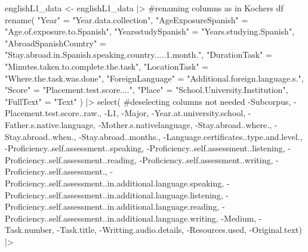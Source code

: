 \documentclass[
  letterpaper,
  DIV=11,
  numbers=noendperiod]{scrartcl}
\newenvironment{Shaded}{\begin{snugshade}}{\end{snugshade}}
\newcommand{\CommentTok}[1]{\textcolor[rgb]{0.37,0.37,0.37}{#1}}
\newcommand{\FunctionTok}[1]{\textcolor[rgb]{0.28,0.35,0.67}{#1}}
\newcommand{\NormalTok}[1]{\textcolor[rgb]{0.00,0.23,0.31}{#1}}
\newcommand{\OtherTok}[1]{\textcolor[rgb]{0.00,0.23,0.31}{#1}}
\newcommand{\SpecialCharTok}[1]{\textcolor[rgb]{0.37,0.37,0.37}{#1}}
\newcommand{\StringTok}[1]{\textcolor[rgb]{0.13,0.47,0.30}{#1}}
\begin{document}
\begin{Shaded}
\begin{Highlighting}[]
\NormalTok{englishL1\_data }\OtherTok{\textless{}{-}}\NormalTok{ englishL1\_data }\SpecialCharTok{|\textgreater{}}  \CommentTok{\#renaming columns as in Kochers df}
  \FunctionTok{rename}\NormalTok{(}
    \StringTok{"Year"} \OtherTok{=} \StringTok{"Year.data.collection"}\NormalTok{,}
    \StringTok{"AgeExposureSpanish"} \OtherTok{=} \StringTok{"Age.of.exposure.to.Spanish"}\NormalTok{,}
    \StringTok{"YearsstudySpanish"} \OtherTok{=} \StringTok{"Years.studying.Spanish"}\NormalTok{,}
    \StringTok{"AbroadSpanishCountry"} \OtherTok{=} \StringTok{"Stay.abroad.in.Spanish.speaking.country.....1.month."}\NormalTok{,}
    \StringTok{"DurationTask"} \OtherTok{=} \StringTok{"Minutes.taken.to.complete.the.task"}\NormalTok{,}
    \StringTok{"LocationTask"} \OtherTok{=} \StringTok{"Where.the.task.was.done"}\NormalTok{,}
    \StringTok{"ForeignLanguage"} \OtherTok{=} \StringTok{"Additional.foreign.language.s."}\NormalTok{,}
    \StringTok{"Score"} \OtherTok{=} \StringTok{"Placement.test.score...."}\NormalTok{,}
    \StringTok{"Place"} \OtherTok{=} \StringTok{"School.University.Institution"}\NormalTok{,}
    \StringTok{"FullText"} \OtherTok{=} \StringTok{"Text"}
\NormalTok{  ) }\SpecialCharTok{|\textgreater{}} 
  \FunctionTok{select}\NormalTok{( }\CommentTok{\#deselecting columns not needed}
    \SpecialCharTok{{-}}\NormalTok{Subcorpus, }\SpecialCharTok{{-}}\NormalTok{Placement.test.score..raw., }\SpecialCharTok{{-}}\NormalTok{L1, }\SpecialCharTok{{-}}\NormalTok{Major, }\SpecialCharTok{{-}}\NormalTok{Year.at.university.school, }\SpecialCharTok{{-}}\NormalTok{Father.s.native.language, }\SpecialCharTok{{-}}\NormalTok{Mother.s.nativelanguage, }\SpecialCharTok{{-}}\NormalTok{Stay.abroad..where., }\SpecialCharTok{{-}}\NormalTok{Stay.abroad..when., }\SpecialCharTok{{-}}\NormalTok{Stay.abroad..months., }\SpecialCharTok{{-}}\NormalTok{Language.certificates..type.and.level., }\SpecialCharTok{{-}}\NormalTok{Proficiency..self.assessment..speaking, }\SpecialCharTok{{-}}\NormalTok{Proficiency..self.assessment..listening, }\SpecialCharTok{{-}}\NormalTok{Proficiency..self.assessment..reading, }\SpecialCharTok{{-}}\NormalTok{Proficiency..self.assessment..writing, }\SpecialCharTok{{-}}\NormalTok{Proficiency..self.assessment., }\SpecialCharTok{{-}}\NormalTok{Proficiency..self.assessment..in.additional.language.speaking, }\SpecialCharTok{{-}}\NormalTok{Proficiency..self.assessment..in.additional.language.listening, }\SpecialCharTok{{-}}\NormalTok{Proficiency..self.assessment..in.additional.language.reading, }\SpecialCharTok{{-}}\NormalTok{Proficiency..self.assessment..in.additional.language.writing, }\SpecialCharTok{{-}}\NormalTok{Medium, }\SpecialCharTok{{-}}\NormalTok{Task.number, }\SpecialCharTok{{-}}\NormalTok{Task.title, }\SpecialCharTok{{-}}\NormalTok{Writting.audio.details, }\SpecialCharTok{{-}}\NormalTok{Resources.used, }\SpecialCharTok{{-}}\NormalTok{Original.text) }\SpecialCharTok{|\textgreater{}} 

\end{Highlighting}
\end{Shaded}
\end{document}
